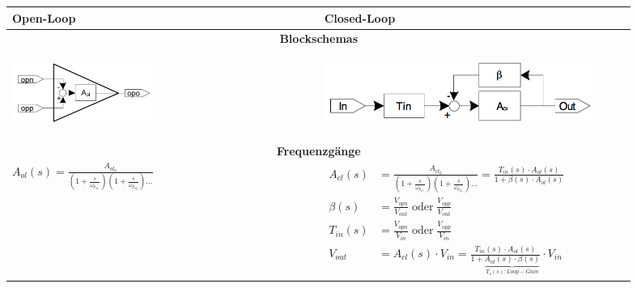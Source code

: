 \begin{tabular}{|p{0.45\linewidth}|p{0.45\linewidth}|}
	\hline
	\textbf{Open-Loop}
		& \textbf{Closed-Loop}\\
	\hline
	\multicolumn{2}{|c|}{\textbf{Blockschemas}}\\
	\hline
    \vspace{-7mm}
	\begin{center}
	 	\includegraphics[height=2cm, valign=t]{./pictures/opAmpOL.png}
	\end{center}
		& \vspace{-7mm}
          \begin{center}
			\includegraphics[height=2cm, valign=t]{./pictures/opAmpCL.png}
		  \end{center}\\
	\hline
	\multicolumn{2}{|c|}{\textbf{Frequenzgänge}}\\
	\hline
	\large{$A_{ol}(s)=\frac{A_{ol_0}}{(1+\frac{s}{\omega_{p_{ol_1}}})(1+\frac{s}{\omega_{p_{ol_2}}})\dots}$}
	& $\begin{aligned}
        A_{cl}(s) &= \frac{A_{cl_0}}{(1+\frac{s}{\omega_{p_{cl_1}}})(1+\frac{s}{\omega_{p_{cl_2}}})\dots} = \frac{T_{in}(s)\cdot A_{ol}(s)}{1+\beta(s)\cdot A_{ol}(s)}\\
		\beta(s) &= \frac{V_{opn}}{V_{out}}\;\text{oder}\;\frac{V_{opp}}{V_{out}}\\
		T_{in}(s) &= \frac{V_{opn}}{V_{in}}\;\text{oder}\;\frac{V_{opp}}{V_{in}}\\
        V_{out} &= A_{cl}(s)\cdot V_{in} = \frac{T_{in}(s)\cdot A_{ol}(s)}{1 + \underbrace{A_{ol}(s)\cdot \beta(s)}_{T_s(s):Loop-Gain}} \cdot V_{in}
	   \end{aligned}$\\
	\hline
\end{tabular}
\\ \\
